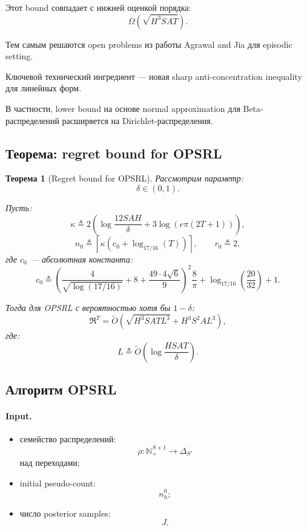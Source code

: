 \documentclass[12pt,a4paper]{article}
\newtheorem{theorem}{Теорема}
\begin{document}
Этот bound совпадает с нижней оценкой порядка:
\[
\Omega
\left(
\sqrt{H^3SAT}
\right).
\]

Тем самым решаются open problems из работы Agrawal and Jia для episodic setting.

Ключевой технический ингредиент --- новая sharp anti-concentration inequality для линейных форм.

В частности, lower bound на основе normal approximation для Beta-распределений расширяется на Dirichlet-распределения.

\subsection{Теорема: regret bound for OPSRL}

\begin{theorem}[Regret bound for OPSRL]
Рассмотрим параметр:
\[
\delta\in(0,1).
\]

Пусть:
\[
\kappa
\triangleq
2
\left(
\log\frac{12SAH}{\delta}
+
3\log
\left(
e\pi(2T+1)
\right)
\right),
\]
\[
n_0
\triangleq
\left\lceil
\kappa
\left(
c_0+\log_{17/16}(T)
\right)
\right\rceil,
\qquad
r_0\triangleq 2,
\]
где $c_0$ --- абсолютная константа:
\[
c_0
\triangleq
\left(
\frac{4}{\sqrt{\log(17/16)}}
+
8
+
\frac{49\cdot 4\sqrt 6}{9}
\right)^2
\frac{8}{\pi}
+
\log_{17/16}
\left(
\frac{20}{32}
\right)
+
1.
\]

Тогда для OPSRL с вероятностью хотя бы $1-\delta$:
\[
\mathfrak R^T
=
\widetilde O
\left(
\sqrt{H^3SATL^3}
+
H^3S^2AL^3
\right),
\]
где:
\[
L
\triangleq
\widetilde O
\left(
\log\frac{HSAT}{\delta}
\right).
\]
\end{theorem}

\subsection{Алгоритм OPSRL}

\paragraph{Input.}

\begin{itemize}
    \item семейство распределений:
    \[
    \rho:\mathbb N_+^{S+1}\to\Delta_{S'}
    \]
    над переходами;
    \item initial pseudo-count:
    \[
    n_h^0;
    \]
    \item число posterior samples:
    \[
    J.
    \]
\end{itemize}
\end{document}
